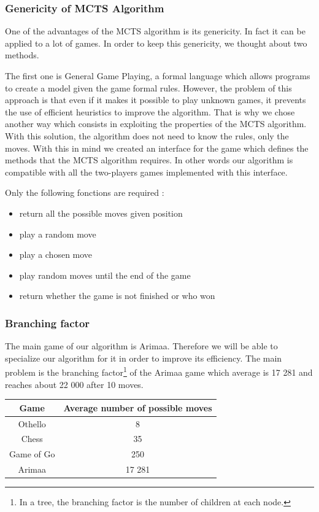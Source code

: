 \subsubsection{Genericity of MCTS Algorithm}

One of the advantages of the MCTS algorithm is its genericity. In fact it can be applied to a lot of games. In order to keep this genericity, we thought about two methods.

The first one is General Game Playing\cite{General_Game_Playing}, a formal language which allows programs to create a model given the game formal rules. However, the problem of this approach is that even if it makes it possible to play unknown games, it prevents the use of efficient heuristics to improve the algorithm.
That is why we chose another way which consists in exploiting the properties of the MCTS algorithm. 
With this solution, the algorithm does not need to know the rules, only the moves. With this in mind we created an interface for the game which defines the methods that the MCTS algorithm requires. In other words our algorithm is compatible with all the two-players games implemented with this interface.

Only the following fonctions are required : 
\begin{itemize}[nolistsep]
\item return all the possible moves given position
\item play a random move
\item play a chosen move 
\item play random moves until the end of the game
\item return whether the game is not finished or who won
\end{itemize}

\subsubsection{Branching factor}

The main game of our algorithm is Arimaa. Therefore we will be able to specialize our algorithm for it in order to improve its efficiency. The main problem is the branching factor\footnote{In a tree, the branching factor is the number of children at each node.} of the Arimaa game which average is 17 281 and reaches about 22 000 after 10 moves\cite{branchin_factor}.

\begin{center}
	\begin{tabular}{ | c | c |}
		\hline Game & Average number of possible moves \\ \hline
		\hline  
		Othello & 8\\
		\hline  
		Chess & 35\\
		\hline  
		Game of Go & 250\\
		\hline
		Arimaa & 17 281\\
		\hline
	\end{tabular}
\end{center}

